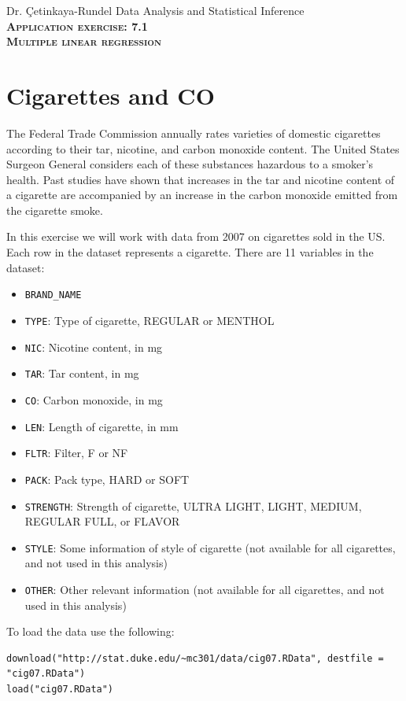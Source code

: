 \documentclass[11pt]{article}
\newcommand{\ttl}[1]{ \textsc{{\LARGE \textbf{{\color{oiB} #1} } }}}
\begin{document}
Dr. \c{C}etinkaya-Rundel \hfill Data Analysis and Statistical Inference \\

\ttl{Application exercise: 7.1 \\
Multiple linear regression}

\section*{Cigarettes and CO}

The Federal Trade Commission annually rates varieties of domestic cigarettes according to their tar, nicotine, and carbon monoxide content. The United States Surgeon General considers each of these substances hazardous to a smoker's health. Past studies have shown that increases in the tar and nicotine content of a cigarette are accompanied by an increase in the carbon monoxide emitted from the cigarette smoke.

In this exercise we will work with data from 2007 on cigarettes sold in the US. Each row in the dataset represents a cigarette. There are 11 variables in the dataset:
{\small
\begin{itemize}
\item \texttt{BRAND\_NAME}
\item \texttt{TYPE}: Type of cigarette, REGULAR or MENTHOL
\item \texttt{NIC}: Nicotine content, in mg
\item \texttt{TAR}: Tar content, in mg
\item \texttt{CO}: Carbon monoxide, in mg
\item \texttt{LEN}: Length of cigarette, in mm
\item \texttt{FLTR}: Filter, F or NF
\item \texttt{PACK}: Pack type, HARD or SOFT   
\item \texttt{STRENGTH}: Strength of cigarette, ULTRA LIGHT, LIGHT, MEDIUM, REGULAR FULL, or FLAVOR
\item \texttt{STYLE}: Some information of style of cigarette (not available for all cigarettes, and not used in this analysis)
\item \texttt{OTHER}: Other relevant information (not available for all cigarettes, and not used in this analysis)
\end{itemize}
}
To load the data use the following:
\begin{verbatim}
download("http://stat.duke.edu/~mc301/data/cig07.RData", destfile = "cig07.RData")
load("cig07.RData")
\end{verbatim}
\end{document}
